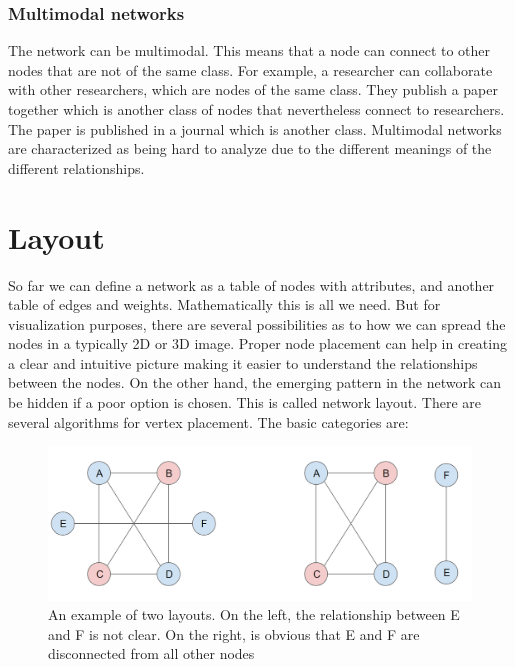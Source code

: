 
\subsubsection{Multimodal networks}

The network can be multimodal. This means that a node can connect to other nodes that are not of the same class. For example, a researcher can collaborate with other researchers, which are nodes of the same class. They publish a paper together which is another class of nodes that nevertheless connect to researchers. The paper is published in a journal which is another class. Multimodal networks are characterized as being hard to analyze due to the different meanings of the different relationships.

\section{Layout}

So far we can define a network as a table of nodes with attributes, and another table of edges and weights. Mathematically this is all we need. But for visualization purposes, there are several possibilities as to how we can spread the nodes in a typically 2D or 3D image. Proper node placement can help in creating a clear and intuitive picture making it easier to understand the relationships between the nodes. On the other hand, the emerging pattern in the network can be hidden if a poor option is chosen. This is called network layout. There are several algorithms for vertex placement. The basic categories are:

    \begin{figure}[H]
        \centering
            \includegraphics[width=0.7\linewidth]{figures/Networks/Layouts/isomorp.png} 
        \caption{An example of two layouts. On the left, the relationship between E and F is not clear. On the right, is obvious that E and F are disconnected from all other nodes}
        \label{figure:networkExampleLayout}
    \end{figure}

